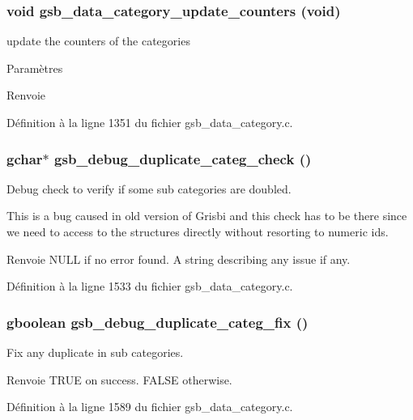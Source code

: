 \subsubsection[{gsb\_\-data\_\-category\_\-update\_\-counters}]{\setlength{\rightskip}{0pt plus 5cm}void gsb\_\-data\_\-category\_\-update\_\-counters (void)}\label{gsb__data__category_8h_a7493a6311c8104b85359d4e5845801f5}
update the counters of the categories


\begin{DoxyParams}{Paramètres}
\item[{\em }]\end{DoxyParams}
\begin{DoxyReturn}{Renvoie}

\end{DoxyReturn}


Définition à la ligne 1351 du fichier gsb\_\-data\_\-category.c.

\subsubsection[{gsb\_\-debug\_\-duplicate\_\-categ\_\-check}]{\setlength{\rightskip}{0pt plus 5cm}gchar$\ast$ gsb\_\-debug\_\-duplicate\_\-categ\_\-check ()}\label{gsb__data__category_8h_a77a566f97efc985ed31a709e0f999884}


Debug check to verify if some sub categories are doubled. 

This is a bug caused in old version of Grisbi and this check has to be there since we need to access to the structures directly without resorting to numeric ids.

\begin{DoxyReturn}{Renvoie}
NULL if no error found. A string describing any issue if any. 
\end{DoxyReturn}


Définition à la ligne 1533 du fichier gsb\_\-data\_\-category.c.

\subsubsection[{gsb\_\-debug\_\-duplicate\_\-categ\_\-fix}]{\setlength{\rightskip}{0pt plus 5cm}gboolean gsb\_\-debug\_\-duplicate\_\-categ\_\-fix ()}\label{gsb__data__category_8h_adc32170e6ce2e5c802d70dc7e0e43085}
Fix any duplicate in sub categories.

\begin{DoxyReturn}{Renvoie}
TRUE on success. FALSE otherwise. 
\end{DoxyReturn}


Définition à la ligne 1589 du fichier gsb\_\-data\_\-category.c.

